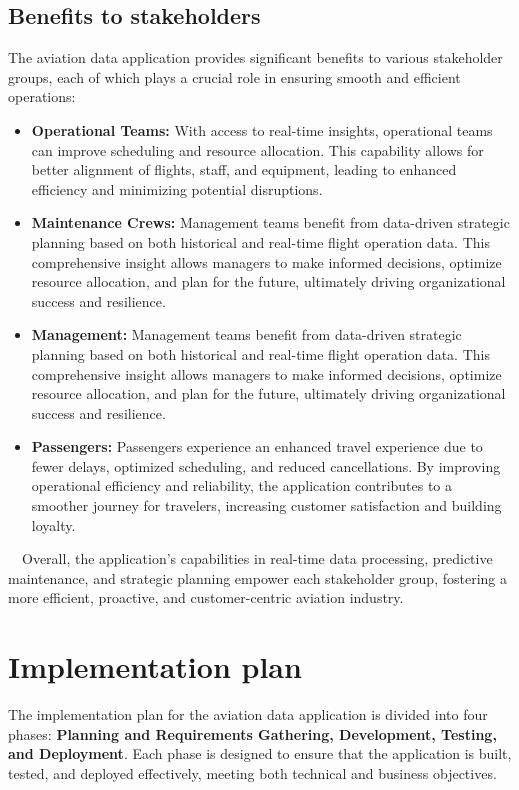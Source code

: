 \documentclass[12pt, a4paper]{article}
\begin{document}
\subsection{Benefits to stakeholders}
The aviation data application provides significant benefits to various
stakeholder groups, each of which plays a crucial role in ensuring smooth and
efficient operations:

\begin{itemize}
    \item \textbf{Operational Teams:} With access to real-time insights,
    operational teams can improve scheduling and resource allocation. This
    capability allows for better alignment of flights, staff, and equipment,
    leading to enhanced efficiency and minimizing potential disruptions.
    \item \textbf{Maintenance Crews:} Management teams benefit from data-driven
    strategic planning based on both historical and real-time flight operation
    data. This comprehensive insight allows managers to make informed decisions,
    optimize resource allocation, and plan for the future, ultimately driving
    organizational success and resilience.
    \item \textbf{Management:} Management teams benefit from data-driven
    strategic planning based on both historical and real-time flight operation
    data. This comprehensive insight allows managers to make informed decisions,
    optimize resource allocation, and plan for the future, ultimately driving
    organizational success and resilience.
    \item \textbf{Passengers:} Passengers experience an enhanced travel
    experience due to fewer delays, optimized scheduling, and reduced
    cancellations. By improving operational efficiency and reliability, the
    application contributes to a smoother journey for travelers, increasing
    customer satisfaction and building loyalty.
\end{itemize}
$\quad$Overall, the application’s capabilities in real-time data processing,
predictive maintenance, and strategic planning empower each stakeholder group,
fostering a more efficient, proactive, and customer-centric aviation industry.

\section{Implementation plan}
The implementation plan for the aviation data application is divided into four
phases: \textbf{Planning and Requirements Gathering, Development, Testing, and
Deployment}. Each phase is designed to ensure that the application is built,
tested, and deployed effectively, meeting both technical and business
objectives.
\end{document}
